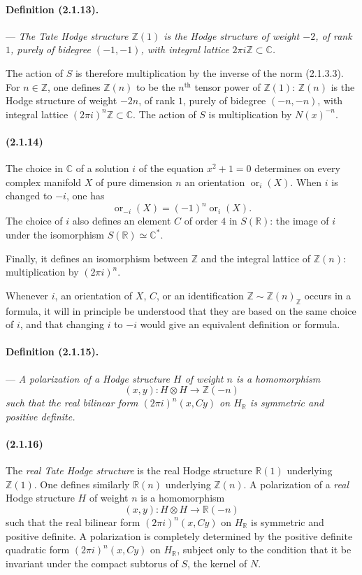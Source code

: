 \documentclass[10pt]{article}
\newcommand{\C}{\mathbb C}
\newcommand{\Z}{\mathbb Z}
\newcommand{\R}{\mathbb R}
\newcommand{\ornt}{\operatorname{or}}
\begin{document}
\paragraph{Definition (2.1.13).} --- \emph{The Tate Hodge structure $\Z(1)$ is the Hodge structure of weight $-2$, of rank $1$, purely of bidegree $(-1,-1)$, with integral lattice $2\pi i\Z\subset\C$.}

The action of $S$ is therefore multiplication by the inverse of the norm (2.1.3.3). For $n\in\Z$, one defines $\Z(n)$ to be the $n^{\text{th}}$ tensor power of $\Z(1)$: $\Z(n)$ is the Hodge structure of weight $-2n$, of rank $1$, purely of bidegree $(-n,-n)$, with integral lattice $(2\pi i)^n\Z\subset\C$. The action of $S$ is multiplication by $N(x)^{-n}$.

\paragraph{(2.1.14)} The choice in $\C$ of a solution $i$ of the equation $x^2+1=0$ determines on every complex manifold $X$ of pure dimension $n$ an orientation $\ornt_i(X)$. When $i$ is changed to $-i$, one has
\[
\ornt_{-i}(X)=(-1)^n\ornt_i(X).
\]
The choice of $i$ also defines an element $C$ of order $4$ in $S(\R)$: the image of $i$ under the isomorphism $S(\R)\simeq\C^*$.

Finally, it defines an isomorphism between $\Z$ and the integral lattice of $\Z(n)$: multiplication by $(2\pi i)^n$.

Whenever $i$, an orientation of $X$, $C$, or an identification $\Z\sim\Z(n)_\Z$ occurs in a formula, it will in principle be understood that they are based on the same choice of $i$, and that changing $i$ to $-i$ would give an equivalent definition or formula.

\paragraph{Definition (2.1.15).} --- {\itshape A polarization of a Hodge structure $H$ of weight $n$ is a homomorphism
\[
(x,y):H\otimes H\longrightarrow\Z(-n)
\]
such that the real bilinear form $(2\pi i)^n(x,Cy)$ on $H_\R$ is symmetric and positive definite.}

\paragraph{(2.1.16)} The \emph{real Tate Hodge structure} is the real Hodge structure $\R(1)$ underlying $\Z(1)$. One defines similarly $\R(n)$ underlying $\Z(n)$. A polarization of a \emph{real} Hodge structure $H$ of weight $n$ is a homomorphism
\[
(x,y):H\otimes H\longrightarrow\R(-n)
\]
such that the real bilinear form $(2\pi i)^n(x,Cy)$ on $H_\R$ is symmetric and positive definite. A polarization is completely determined by the positive definite quadratic form $(2\pi i)^n(x,Cy)$ on $H_\R$, subject only to the condition that it be invariant under the compact subtorus of $S$, the kernel of $N$.
\end{document}
